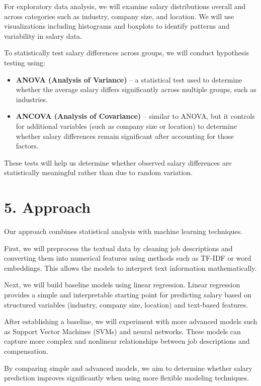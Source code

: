 \documentclass[11pt]{article}
\begin{document}
For exploratory data analysis, we will examine salary distributions overall and across categories such as industry, company size, and location. We will use visualizations including histograms and boxplots to identify patterns and variability in salary data.

To statistically test salary differences across groups, we will conduct hypothesis testing using:

\begin{itemize}
    \item \textbf{ANOVA (Analysis of Variance)} -- a statistical test used to determine whether the average salary differs significantly across multiple groups, such as industries.
    \item \textbf{ANCOVA (Analysis of Covariance)} -- similar to ANOVA, but it controls for additional variables (such as company size or location) to determine whether salary differences remain significant after accounting for those factors.
\end{itemize}

These tests will help us determine whether observed salary differences are statistically meaningful rather than due to random variation.

\section*{5. Approach}

Our approach combines statistical analysis with machine learning techniques.

First, we will preprocess the textual data by cleaning job descriptions and converting them into numerical features using methods such as TF-IDF or word embeddings. This allows the models to interpret text information mathematically.

Next, we will build baseline models using linear regression. Linear regression provides a simple and interpretable starting point for predicting salary based on structured variables (industry, company size, location) and text-based features.

After establishing a baseline, we will experiment with more advanced models such as Support Vector Machines (SVMs) and neural networks. These models can capture more complex and nonlinear relationships between job descriptions and compensation.

By comparing simple and advanced models, we aim to determine whether salary prediction improves significantly when using more flexible modeling techniques.
\end{document}
